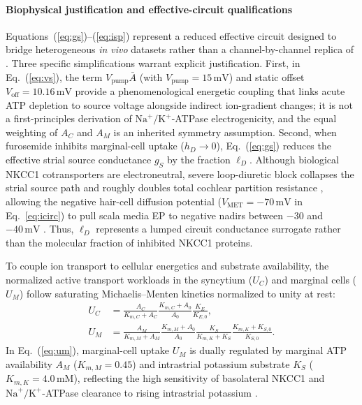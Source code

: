 \documentclass[final,5p,times]{elsarticle}
\begin{document}
\paragraph*{Biophysical justification and effective-circuit qualifications}
Equations~(\ref{eq:gs})--(\ref{eq:isp}) represent a reduced effective circuit designed to bridge heterogeneous \emph{in vivo} datasets rather than a channel-by-channel replica of \citet{Nin2012}. Three specific simplifications warrant explicit justification. First, in Eq.~(\ref{eq:vs}), the term \(V_{\mathrm{pump}}\bar{A}\) (with \(V_{\mathrm{pump}} = 15\,\mathrm{mV}\)) and static offset \(V_{\mathrm{off}} = 10.16\,\mathrm{mV}\) provide a phenomenological energetic coupling that links acute ATP depletion to source voltage alongside indirect ion-gradient changes; it is not a first-principles derivation of \(\mathrm{Na}^+/\mathrm{K}^+\)-ATPase electrogenicity, and the equal weighting of \(A_C\) and \(A_M\) is an inherited symmetry assumption. Second, when furosemide inhibits marginal-cell uptake (\(h_D \to 0\)), Eq.~(\ref{eq:gs}) reduces the effective strial source conductance \(g_S\) by the fraction \(\ell_D\). Although biological NKCC1 cotransporters are electroneutral, severe loop-diuretic block collapses the strial source path and roughly doubles total cochlear partition resistance \citep{AsakumaSnow1980}, allowing the negative hair-cell diffusion potential (\(V_{\mathrm{MET}} = -70\,\mathrm{mV}\) in Eq.~\ref{eq:icirc}) to pull scala media EP to negative nadirs between \(-30\) and \(-40\,\mathrm{mV}\) \citep{Bosher1979,PikeBosher1980}. Thus, \(\ell_D\) represents a lumped circuit conductance surrogate rather than the molecular fraction of inhibited NKCC1 proteins.

To couple ion transport to cellular energetics and substrate availability, the normalized active transport workloads in the syncytium (\(U_C\)) and marginal cells (\(U_M\)) follow saturating Michaelis--Menten kinetics normalized to unity at rest:
\begin{align}
  U_C &= \frac{A_C}{K_{m,C} + A_C}\frac{K_{m,C} + A_0}{A_0}\frac{K_E}{K_{E,0}}, \label{eq:uc}\\
  U_M &= \frac{A_M}{K_{m,M} + A_M}\frac{K_{m,M} + A_0}{A_0}\frac{K_S}{K_{m,K} + K_S}\frac{K_{m,K} + K_{S,0}}{K_{S,0}}. \label{eq:um}
\end{align}
In Eq.~(\ref{eq:um}), marginal-cell uptake \(U_M\) is dually regulated by marginal ATP availability \(A_M\) (\(K_{m,M} = 0.45\)) and intrastrial potassium substrate \(K_S\) (\(K_{m,K} = 4.0\,\mathrm{mM}\)), reflecting the high sensitivity of basolateral NKCC1 and \(\mathrm{Na}^+/\mathrm{K}^+\)-ATPase clearance to rising intrastrial potassium \citep{Nin2008,NinHibino2016}.
\end{document}
